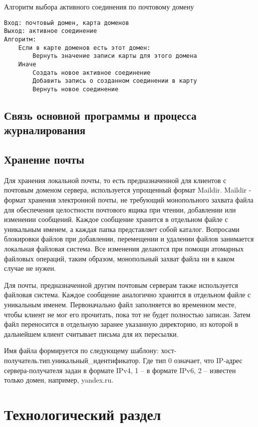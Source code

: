 \documentclass[a4paper,12pt]{report}
\begin{document}
Алгоритм выбора активного соединения по почтовому домену
\begin{verbatim}
Вход: почтовый домен, карта доменов
Выход: активное соединение
Алгоритм:
    Если в карте доменов есть этот домен:
        Вернуть значение записи карты для этого домена
    Иначе
        Создать новое активное соединение
        Добавить запись о созданном соединении в карту
        Вернуть новое соединение
\end{verbatim}


\section{Связь основной программы и процесса журналирования}


\section{Хранение почты}

Для хранения локальной почты, то есть предназначенной для клиентов с почтовым доменом сервера, используется упрощенный формат Maildir. Maildir - формат хранения электронной почты, не требующий монопольного захвата файла для обеспечения целостности почтового ящика при чтении, добавлении или изменении сообщений. Каждое сообщение хранится в отдельном файле с уникальным именем, а каждая папка представляет собой каталог. Вопросами блокировки файлов при добавлении, перемещении и удалении файлов занимается локальная файловая система. Все изменения делаются при помощи атомарных файловых операций, таким образом, монопольный захват файла ни в каком случае не нужен.

Для почты, предназначенной другим почтовым серверам также используется файловая система. Каждое сообщение аналогично хранится в отдельном файле с уникальным именем. Первоначально файл заполняется во временном месте, чтобы клиент не мог его прочитать, пока тот не будет полностью записан. Затем файл переносится в отдельную заранее указанную директорию, из которой в дальнейшем клиент считывает письма для их пересылки. 

Имя файла формируется по следующему шаблону: хост-получатель.тип.уникальный\_идентификатор. Где тип 0 означает, что IP-адрес сервера-получателя задан в формате IPv4, 1 -- в формате IPv6, 2 -- известен только домен, например, yandex.ru.


\chapter{Технологический раздел}
\end{document}
